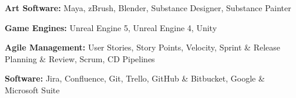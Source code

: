 


\begin{cvparagraph}
    \begin{cvitems}
        \text{}
        \item
        \item \textbf{Art Software:} Maya, zBrush, Blender, Substance Designer, Substance Painter
        \item \textbf{Game Engines:} Unreal Engine 5, Unreal Engine 4, Unity
        \item \textbf{Agile Management:} User Stories, Story Points, Velocity, Sprint \& Release Planning \& Review, Scrum, CD Pipelines
        \item \textbf{Software:} Jira, Confluence, Git, Trello, GitHub \& Bitbucket, Google \& Microsoft Suite
    \end{cvitems}

\end{cvparagraph}